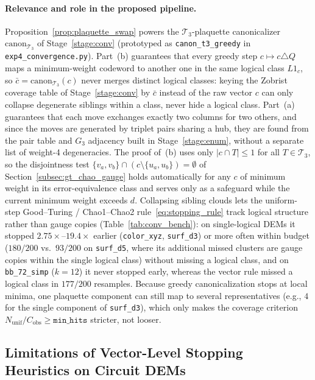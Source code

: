 \documentclass[12pt]{article}
\theoremstyle{definition}
\newcommand{\Tc}{\mathcal{T}_3}
\newcommand{\ttt}[1]{\texttt{#1}}
\begin{document}
\paragraph{Relevance and role in the proposed pipeline.}
Proposition~\ref{prop:plaquette_swap} powers the $\Tc$-plaquette canonicalizer $\mathrm{canon}_{\Tc}$ of
Stage~\ref{stage:conv} (prototyped as \ttt{canon\_t3\_greedy} in \ttt{exp4\_convergence.py}). Part~(b) guarantees
that every greedy step $c \mapsto c \triangle Q$ maps a minimum-weight codeword to another one in the same logical
class $L 1_c$, so $\bar{c} = \mathrm{canon}_{\Tc}(c)$ never merges distinct logical classes: keying the
Zobrist coverage table of Stage~\ref{stage:conv} by $\bar{c}$ instead of the raw vector $c$ can only collapse
degenerate siblings within a class, never hide a logical class. Part~(a) guarantees that each move exchanges exactly
two columns for two others, and since the moves are generated by triplet pairs sharing a hub, they are found from the
pair table and $G_3$ adjacency built in Stage~\ref{stage:enum}, without a separate list of weight-4 degeneracies. The
proof of~(b) uses only $|c \cap T| \le 1$ for all $T \in \Tc$, so the disjointness test $\{v_a, v_b\} \cap (c
\setminus \{u_a, u_b\}) = \emptyset$ of Section~\ref{subsec:gt_chao_gauge} holds automatically for any $c$ of minimum
weight in its error-equivalence class and serves only as a safeguard while the current minimum weight exceeds $d$.
Collapsing sibling clouds lets the uniform-step Good--Turing / Chao1--Chao2 rule~\eqref{eq:stopping_rule} track
logical structure rather than gauge copies (Table~\ref{tab:conv_bench}): on single-logical DEMs it stopped
$2.75\times$--$19.4\times$ earlier (\ttt{color\_xyz}, \ttt{surf\_d3}) or more often within budget ($180/200$ vs.\
$93/200$ on \ttt{surf\_d5}, where its additional missed clusters are gauge copies within the single logical class)
without missing a logical class, and on \ttt{bb\_72\_simp} ($k = 12$) it never stopped early, whereas the vector rule
missed a logical class in $177/200$ resamples. Because greedy canonicalization stops at local minima, one plaquette
component can still map to several representatives (e.g., $4$ for the single component of \ttt{surf\_d3}), which only
makes the coverage criterion $N_{\mathrm{unif}}/C_{\mathrm{obs}} \ge \ttt{min\_hits}$ stricter, not looser.

\subsection{Limitations of Vector-Level Stopping Heuristics on Circuit DEMs}\label{subsec:stopping_failures}
\end{document}
